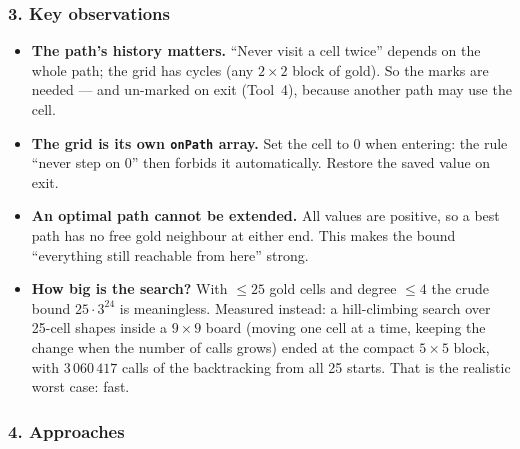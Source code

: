 \subsubsection*{3. Key observations}

\begin{itemize}[leftmargin=*]
    \item \textbf{The path's history matters.} ``Never visit a cell twice'' depends on the whole path; the grid has cycles (any $2 \times 2$ block of gold). So the marks are needed --- and un-marked on exit (Tool~4), because another path may use the cell.
    \item \textbf{The grid is its own \texttt{onPath} array.} Set the cell to 0 when entering: the rule ``never step on 0'' then forbids it automatically. Restore the saved value on exit.
    \item \textbf{An optimal path cannot be extended.} All values are positive, so a best path has no free gold neighbour at either end. This makes the bound ``everything still reachable from here'' strong.
    \item \textbf{How big is the search?} With $\le 25$ gold cells and degree $\le 4$ the crude bound $25 \cdot 3^{24}$ is meaningless. Measured instead: a hill-climbing search over 25-cell shapes inside a $9 \times 9$ board (moving one cell at a time, keeping the change when the number of calls grows) ended at the compact $5 \times 5$ block, with $3\,060\,417$ calls of the backtracking from all 25 starts. That is the realistic worst case: fast.
\end{itemize}

\subsubsection*{4. Approaches}

